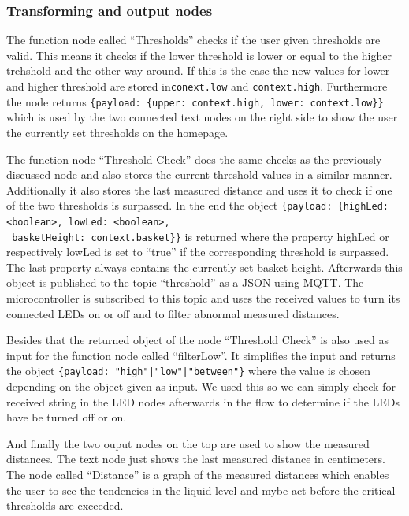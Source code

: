 \documentclass{article}
\begin{document}
\subsubsection{Transforming and output nodes}
The function node called \enquote{Thresholds} checks if the user given thresholds are valid. This means it checks if the lower threshold is lower or equal to the higher trehshold and the other way around. If this is the case the new values for lower and higher threshold are stored in\verb|conext.low| and \verb|context.high|. Furthermore the node returns \verb|{payload: {upper: context.high, lower: context.low}}| which is used by the two connected text nodes on the right side to show the user the currently set thresholds on the homepage.\par 
The function node \enquote{Threshold Check} does the same checks as the previously discussed node and also stores the current threshold values in a similar manner.  Additionally it also stores the last measured distance and uses it to check if one of the two thresholds is surpassed. In the end the object \verb|{payload: {highLed: <boolean>, lowLed: <boolean>,|\\
 \verb| basketHeight: context.basket}}| is returned where the property highLed or respectively lowLed is set to \enquote{true} if the corresponding threshold is surpassed. The last property always contains the currently set basket height. Afterwards this object is published to the topic \enquote{threshold} as a JSON using MQTT. The microcontroller is subscribed to this topic and uses the received values to turn its connected LEDs on or off and to filter abnormal measured distances.\par 
Besides that the returned object of the node \enquote{Threshold Check} is also used as input for the function node called \enquote{filterLow}. It simplifies the input and returns the object \texttt{\{payload: "high"|"low"|"between"\}} where the value is chosen depending on the object given as input. We used this so we can simply check for received string in the LED nodes afterwards in the flow to determine if the LEDs have be turned off or on.\par 
And finally the two ouput nodes on the top are used to show the measured distances. The text node just shows the last measured distance in centimeters. The node called \enquote{Distance} is a graph of the measured distances which enables the user to see the tendencies in the liquid level and mybe act before the critical thresholds are exceeded.
\end{document}
